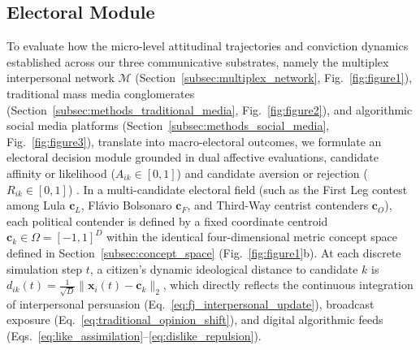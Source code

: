 \documentclass{article}
\begin{document}
\subsection{Electoral Module}
\label{subsec:electoral_module}

To evaluate how the micro-level attitudinal trajectories and conviction dynamics established across our three communicative substrates, namely the multiplex interpersonal network $\mathcal{M}$ (Section~\ref{subsec:multiplex_network}, Fig.~\ref{fig:figure1}), traditional mass media conglomerates (Section~\ref{subsec:methods_traditional_media}, Fig.~\ref{fig:figure2}), and algorithmic social media platforms (Section~\ref{subsec:methods_social_media}, Fig.~\ref{fig:figure3}), translate into macro-electoral outcomes, we formulate an electoral decision module grounded in dual affective evaluations, candidate affinity or likelihood ($A_{ik} \in [0, 1]$) and candidate aversion or rejection ($R_{ik} \in [0, 1]$) \citep{soroka2014negativity, lau2007effects}. In a multi-candidate electoral field (such as the First Leg contest among Lula $\mathbf{c}_L$, Fl{\'a}vio Bolsonaro $\mathbf{c}_F$, and Third-Way centrist contenders $\mathbf{c}_O$), each political contender is defined by a fixed coordinate centroid $\mathbf{c}_k \in \Omega = [-1, 1]^D$ within the identical four-dimensional metric concept space defined in Section~\ref{subsec:concept_space} (Fig.~\ref{fig:figure1}b). At each discrete simulation step $t$, a citizen's dynamic ideological distance to candidate $k$ is $d_{ik}(t) = \frac{1}{\sqrt{D}}\|\mathbf{x}_i(t) - \mathbf{c}_k\|_2$, which directly reflects the continuous integration of interpersonal persuasion (Eq.~\eqref{eq:fj_interpersonal_update}), broadcast exposure (Eq.~\eqref{eq:traditional_opinion_shift}), and digital algorithmic feeds (Eqs.~\eqref{eq:like_assimilation}--\eqref{eq:dislike_repulsion}).
\end{document}

